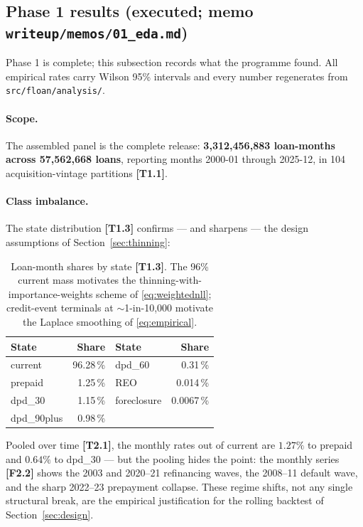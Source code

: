 \documentclass[11pt,a4paper]{article}
\newcommand{\code}[1]{\texttt{#1}}
\newcommand{\state}[1]{\textsf{#1}}
\newcommand{\artifact}[1]{\textbf{[#1]}}
\begin{document}
\subsection{Phase 1 results (executed; memo \code{writeup/memos/01\_eda.md})}\label{sec:edaresults}

Phase 1 is complete; this subsection records what the programme found. All empirical rates carry Wilson 95\% intervals and every number regenerates from \code{src/floan/analysis/}.

\paragraph{Scope.} The assembled panel is the complete release: \textbf{3{,}312{,}456{,}883 loan-months across 57{,}562{,}668 loans}, reporting months 2000-01 through 2025-12, in 104 acquisition-vintage partitions \artifact{T1.1}.

\paragraph{Class imbalance.} The state distribution \artifact{T1.3} confirms --- and sharpens --- the design assumptions of Section~\ref{sec:thinning}:

\begin{table}[h]
\centering\small
\begin{tabular}{lr@{\qquad\qquad}lr}
\toprule
State & Share & State & Share \\
\midrule
\state{current}    & 96.28\,\% & \state{dpd\_60}      & 0.31\,\% \\
\state{prepaid}    & 1.25\,\%  & \state{REO}          & 0.014\,\% \\
\state{dpd\_30}    & 1.15\,\%  & \state{foreclosure}  & 0.0067\,\% \\
\state{dpd\_90plus}& 0.98\,\%  & & \\
\bottomrule
\end{tabular}
\caption{Loan-month shares by state \artifact{T1.3}. The 96\% \state{current} mass motivates the thinning-with-importance-weights scheme of \eqref{eq:weightednll}; credit-event terminals at $\sim$1-in-10{,}000 motivate the Laplace smoothing of \eqref{eq:empirical}.}
\label{tab:stateshares}
\end{table}

Pooled over time \artifact{T2.1}, the monthly rates out of \state{current} are $1.27\%$ to \state{prepaid} and $0.64\%$ to \state{dpd\_30} --- but the pooling hides the point: the monthly series \artifact{F2.2} shows the 2003 and 2020--21 refinancing waves, the 2008--11 default wave, and the sharp 2022--23 prepayment collapse. These regime shifts, not any single structural break, are the empirical justification for the rolling backtest of Section~\ref{sec:design}.
\end{document}
